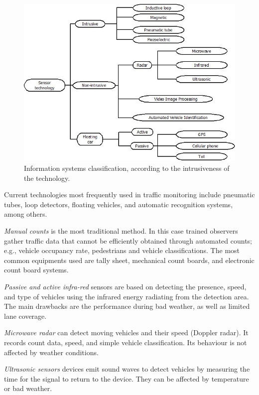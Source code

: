 \documentclass[preprint,authoryear,12pt]{elsarticle}
\begin{document}
\begin{figure}[htpb] 
\begin{center} 
\includegraphics[scale=0.55]{intrusivos.jpeg}  %
\end{center} 
\caption{Information systems classification, according to the intrusiveness of the technology.} 
\label{tipossensores} 
\end{figure}

Current technologies most frequently used in traffic monitoring include pneumatic tubes, loop detectors, floating vehicles, and automatic recognition systems, among others.


\emph{Manual counts} is the most traditional method. In this case trained observers gather traffic data that cannot be efficiently obtained through automated counts; e.g., vehicle occupancy rate, pedestrians and vehicle classifications. The most common equipments used are tally sheet, mechanical count boards, and electronic count board systems.

\emph{Passive and active infra-red} sensors are based on detecting the presence, speed, and type of vehicles using the infrared energy radiating from the detection area. The main drawbacks are the performance during bad weather, as well as limited lane coverage.

\emph{Microwave radar} can detect moving vehicles and their speed (Doppler radar). It records count data, speed, and simple vehicle classification. Its behaviour is not affected by weather conditions.

\emph{Ultrasonic sensors} devices emit sound waves to detect vehicles by measuring the time for the signal to return to the device. They can be affected by temperature or bad weather. 
\end{document}
